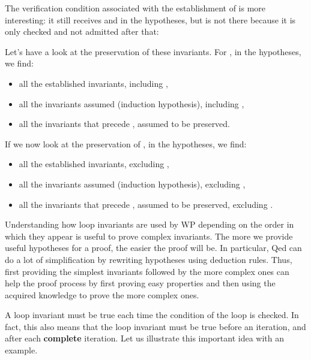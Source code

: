The verification condition associated with the establishment of  is
more interesting: it still receives  and  in the
hypotheses, but  is not there because it is only checked and not
admitted after that:




Let's have a look at the preservation of these invariants. For
, in the hypotheses, we find:
\begin{itemize}
  \item all the established invariants, including ,
  \item all the invariants assumed (induction hypothesis), including ,
  \item all the invariants that precede , assumed to be preserved.
\end{itemize}




If we now look at the preservation of , in the
hypotheses, we find:
\begin{itemize}
  \item all the established invariants, excluding ,
  \item all the invariants assumed (induction hypothesis), excluding ,
  \item all the invariants that precede , assumed to be preserved,
        excluding .
\end{itemize}




Understanding how loop invariants are used by WP depending on the order in which
they appear is useful to prove complex invariants. The more we provide useful
hypotheses for a proof, the easier the proof will be. In particular, Qed can do
a lot of simplification by rewriting hypotheses using deduction rules. Thus,
first providing the simplest invariants followed by the more complex ones can help the
proof process by first proving easy properties and then using the acquired
knowledge to prove the more complex ones.




A loop invariant must be true each time the condition of the loop is checked. In
fact, this also means that the loop invariant must be true before an iteration, and after
each \textbf{complete} iteration. Let us illustrate this important
idea with an example.



